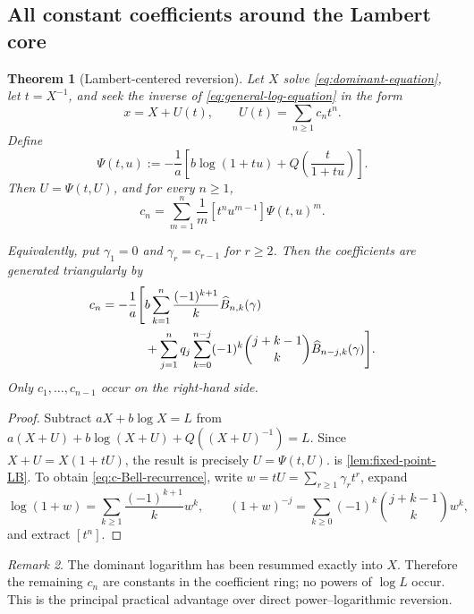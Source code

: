\documentclass[11pt,a4paper]{article}
\numberwithin{equation}{section}
\newtheorem{theorem}{Theorem}[section]
\theoremstyle{definition}
\theoremstyle{remark}
\newtheorem{remark}[theorem]{Remark}
\begin{document}
\subsection{All constant coefficients around the Lambert core}

\begin{theorem}[Lambert-centered reversion]\label{thm:lambert-centered}
Let \(X\) solve \cref{eq:dominant-equation}, let \(t=X^{-1}\), and seek the
inverse of \cref{eq:general-log-equation} in the form
\begin{equation}\label{eq:Lambert-centered-ansatz}
 x=X+U(t),\qquad U(t)=\sum_{n\ge1}c_nt^n.
\end{equation}
Define
\begin{equation}\label{eq:Psi-general}
 \Psi(t,u):=-\frac1a\left[
 b\log(1+tu)+Q\!\left(\frac{t}{1+tu}\right)
 \right].
\end{equation}
Then \(U=\Psi(t,U)\), and for every \(n\ge1\),
\begin{equation}\label{eq:c-Lagrange-general}
 c_n=\sum_{m=1}^n\frac1m[t^nu^{m-1}]\Psi(t,u)^m.
\end{equation}

Equivalently, put \(\gamma_1=0\) and
\(\gamma_r=c_{r-1}\) for \(r\ge2\).  Then the coefficients are generated
triangularly by
\begin{align}
 c_n=-\frac1a\Bigg[&
 b\sum_{k=1}^n\frac{(-1)^{k+1}}{k}
       \widehat B_{n,k}(\gamma)\notag\\
 &+\sum_{j=1}^nq_j
   \sum_{k=0}^{n-j}(-1)^k\binom{j+k-1}{k}
       \widehat B_{n-j,k}(\gamma)
 \Bigg].\label{eq:c-Bell-recurrence}
\end{align}
Only \(c_1,\ldots,c_{n-1}\) occur on the right-hand side.
\end{theorem}

\begin{proof}
Subtract \(aX+b\log X=L\) from
\(a(X+U)+b\log(X+U)+Q((X+U)^{-1})=L\).  Since
\(X+U=X(1+tU)\), the result is precisely \(U=\Psi(t,U)\).
 is
\cref{lem:fixed-point-LB}.  To obtain \cref{eq:c-Bell-recurrence}, write
\(w=tU=\sum_{r\ge1}\gamma_rt^r\), expand
\[
 \log(1+w)=\sum_{k\ge1}\frac{(-1)^{k+1}}{k}w^k,
 \qquad
 (1+w)^{-j}=\sum_{k\ge0}(-1)^k\binom{j+k-1}{k}w^k,
\]
and extract \([t^n]\).
\end{proof}

\begin{remark}
The dominant logarithm has been resummed exactly into \(X\).  Therefore the
remaining \(c_n\) are constants in the coefficient ring; no powers of
\(\log L\) occur.  This is the principal practical advantage over direct
power--logarithmic reversion.
\end{remark}
\end{document}
